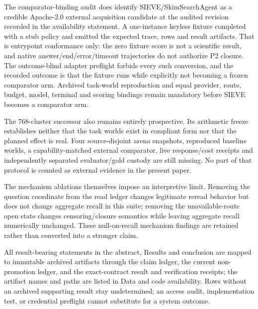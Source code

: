 \documentclass[11pt]{article}
\theoremstyle{definition}
\begin{document}
The comparator-binding audit does identify SIEVE/SkimSearchAgent as a credible
Apache-2.0 external acquisition candidate at the audited revision recorded in
the availability statement. A one-instance keyless fixture
completed with a stub policy and emitted the expected trace, rows and result
artifacts. That is entrypoint conformance only: the zero fixture score is not a
scientific result, and native answer/end/error/timeout trajectories do not
authorize P2 closure. The outcome-blind adapter preflight forbids every such
conversion, and the recorded outcome is that the fixture runs while explicitly
not becoming a frozen comparator arm. Archived task-world
reproduction and equal provider, route, budget, model, terminal and scoring
bindings remain mandatory before SIEVE becomes a comparator arm.

The 768-cluster successor also remains entirely prospective.  Its arithmetic
freeze establishes neither that the task worlds exist in compliant form nor
that the planned effect is real.  Four source-disjoint arena snapshots,
reproduced baseline worlds, a capability-matched external comparator, live
response/cost receipts and independently separated evaluator/gold custody are
still missing.  No part of that protocol is counted as external evidence in the
present paper.

The mechanism ablations themselves impose an interpretive limit. Removing the question coordinate from the read ledger changes legitimate reread behavior but does not change aggregate recall in this suite; removing the unavailable-route open state changes censoring/closure semantics while leaving aggregate recall numerically unchanged. These null-on-recall mechanism findings are retained rather than converted into a stronger claim.

All result-bearing statements in the abstract, Results and conclusion are mapped to immutable archived artifacts through the claim ledger, the current non-promotion ledger, and the exact-contract result and verification receipts; the artifact names and paths are listed in Data and code availability. Rows without an archived supporting result stay undetermined; an access audit, implementation test, or credential preflight cannot substitute for a system outcome.


\end{document}
